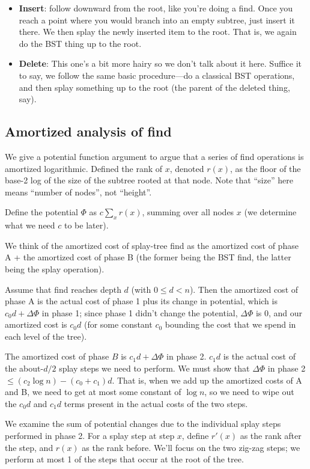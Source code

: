 \documentclass{article}
\begin{document}
\begin{itemize}
	\item
	\textbf{Insert}: follow downward from the root, like you're doing a find.
	Once you reach a point where you would branch into an empty subtree,
	just insert it there.
	We then splay the newly inserted item to the root.
	That is, we again do the BST thing up to the root.
	
	\item
	\textbf{Delete}: This one's a bit more hairy so we don't talk about it
	here. Suffice it to say, we follow the same basic procedure---do a
	classical BST operations, and then splay something up to the root
	(the parent of the deleted thing, say).
\end{itemize}


\subsection{Amortized analysis of find}

We give a potential function argument to argue that a series of find
operations is amortized logarithmic.
Defined the rank of $x$, denoted $r(x)$, as the floor of the base-2 log
of the size of the subtree rooted at that node.
Note that ``size'' here means ``number of nodes'', not ``height''.

Define the potential $\Phi$ as $c\sum_x r(x)$, summing over all nodes $x$
(we determine what we need $c$ to be later).

We think of the amortized cost of splay-tree find as the amortized cost
of phase A + the amortized cost of phase B (the former being the BST find,
the latter being the splay operation).

Assume that find reaches depth $d$ (with $0\leq d < n$).
Then the amortized cost of phase A is the actual cost of phase 1 plus its
change in potential, which is $c_0d + \Delta\Phi$ in phase 1; since phase
1 didn't change the potential, $\Delta\Phi$ is 0, and our amortized cost
is $c_0 d$ (for some constant $c_0$ bounding the cost that we
spend in each level of the tree).

The amortized cost of phase $B$ is $c_1 d + \Delta\Phi$ in phase 2.
$c_1 d$ is the actual cost of the about-$d/2$ splay steps we need to perform.
We must show that $\Delta\Phi$ in phase 2 $\leq (c_2\log n) - (c_0 + c_1)d$.
That is, when we add up the amortized costs of A and B, we need to get
at most some constant of $\log n$, so we need to wipe out the $c_0 d$ and
$c_1 d$ terms present in the actual costs of the two steps.

We examine the sum of potential changes due to the individual splay steps
performed in phase 2.
For a splay step at step $x$, define $r'(x)$ as the rank after the step,
and $r(x)$ as the rank before.
We'll focus on the two zig-zag steps; we perform at most 1 of the steps
that occur at the root of the tree.
\end{document}
